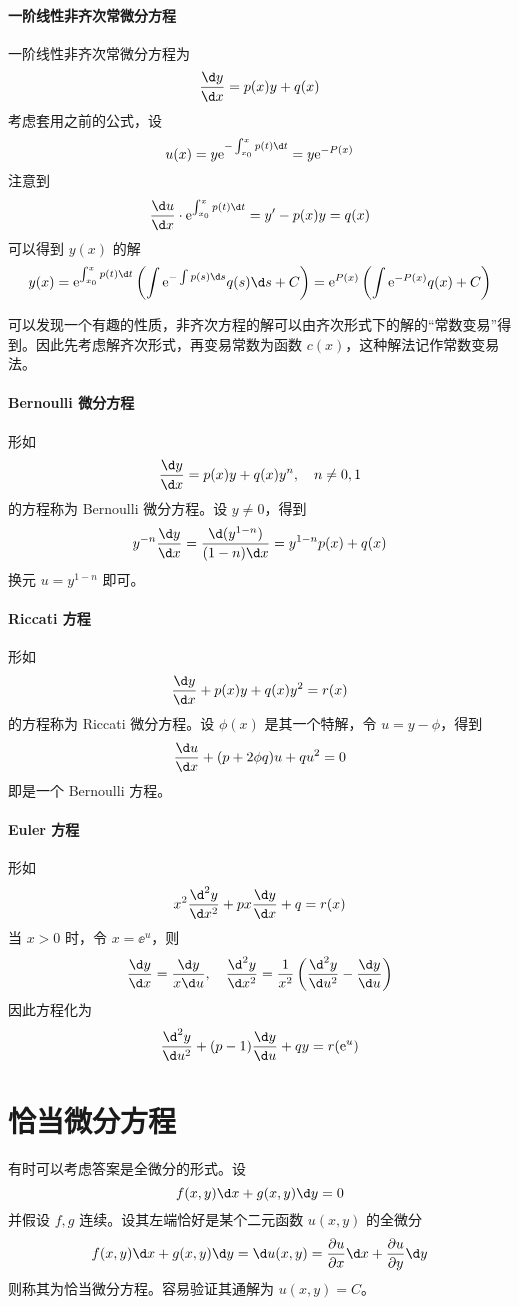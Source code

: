 \paragraph{一阶线性非齐次常微分方程} 一阶线性非齐次常微分方程为
\[ \frac{\d y}{\d x} = p(x) y + q(x) \]
考虑套用之前的公式，设
\[ u(x) = y \ee^{-\int_{x_0}^{x} p(t) \d t} = y \ee^{-P(x)} \]
注意到
\[ \frac{\d u}{\d x} \cdot \ee^{\int_{x_0}^{x} p(t) \d t} = y' - p(x) y = q(x) \]
可以得到 $y(x)$ 的解
\[ y(x) = \ee^{\int_{x_0}^{x} p(t) \d t} \left(  \int \ee^{-\int p(s) \d s} q(s) \d s + C \right)
	= \ee^{P(x)} \left( \int \ee^{-P(x)} q(x) + C \right)  \]

可以发现一个有趣的性质，非齐次方程的解可以由齐次形式下的解的“常数变易”得到。因此先考虑解齐次形式，再变易常数为函数 $c(x)$，这种解法记作常数变易法。

\paragraph{Bernoulli 微分方程} 形如
\[ \frac{\d y}{\d x} = p(x) y + q(x) y^n, \quad n \neq 0,1 \]
的方程称为 Bernoulli 微分方程。设 $y \neq 0$，得到
\[ y^{-n} \frac{\d y}{\d x} = \frac{\d (y^{1-n})}{(1-n)\d x} = y^{1-n}p(x) + q(x) \]
换元 $u = y^{1-n}$ 即可。

\paragraph{Riccati 方程}
形如
\[ \frac{\d y}{\d x} + p(x) y + q(x)y^2 = r(x) \]
的方程称为 Riccati 微分方程。设 $\phi(x)$ 是其一个特解，令 $u = y - \phi$，得到
\[ \frac{\d u}{\d x} + (p + 2 \phi q) u + q u^2 = 0 \]
即是一个 Bernoulli 方程。

\paragraph{Euler 方程}
形如
\[ x^2 \frac{\d^2 y}{\d x^2} + p x \frac{\d y}{\d x} + q = r(x) \]
当 $x > 0$ 时，令 $x = \ee^u$，则
\[ \frac{\d y}{\d x} = \frac{\d y}{x \d u}, \quad \frac{\d^2 y}{\d x^2} = \frac{1}{x^2} \left( \frac{\d^2 y}{\d u^2} - \frac{\d y}{\d u} \right) \]
因此方程化为
\[ \frac{\d^2 y}{\d u^2} + (p-1) \frac{\d y}{\d u} + qy = r(\ee^u) \]


\section{恰当微分方程}

有时可以考虑答案是全微分的形式。设
\[ f(x, y) \d x + g(x, y) \d y = 0 \]
并假设 $f, g$ 连续。设其左端恰好是某个二元函数 $u(x, y)$ 的全微分
\[ f(x, y) \d x + g(x, y) \d y = \d u(x, y) = \frac{\partial u}{\partial x} \d x + \frac{\partial u}{\partial y} \d y \]
则称其为恰当微分方程。容易验证其通解为 $u(x, y) = C$。

